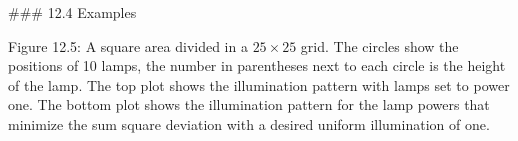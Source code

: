 

### 12.4 Examples

Figure 12.5: A square area divided in a \(25\times 25\) grid. The circles show the positions of 10 lamps, the number in parentheses next to each circle is the height of the lamp. The top plot shows the illumination pattern with lamps set to power one. The bottom plot shows the illumination pattern for the lamp powers that minimize the sum square deviation with a desired uniform illumination of one.

